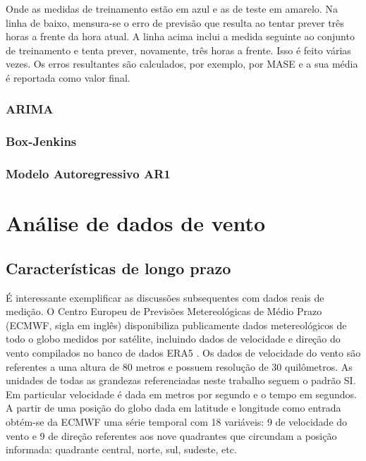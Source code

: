 \documentclass[
	12pt,				%
	openright,			%
	oneside,			%
	a4paper,			%
	english,			%
	french,				%
	spanish,			%
	brazil				%
	]{abntex2}
\begin{document}
Onde as medidas de treinamento estão em azul e as de teste em amarelo. Na linha de baixo, mensura-se o erro de previsão que resulta ao tentar prever três horas a frente da hora atual. A linha acima inclui a medida seguinte ao conjunto de treinamento e tenta prever, novamente, três horas a frente. Isso é feito várias vezes. Os erros resultantes são calculados, por exemplo, por MASE e a sua média é reportada como valor final.

\section{ARIMA}



\section{Box-Jenkins}

\section{Modelo Autoregressivo AR1}

%

\cleardoublepage
\part{Análise de dados de vento}

\chapter{Características de longo prazo}

É interessante exemplificar as discussões subsequentes com dados reais de medição. O Centro Europeu de Previsões Metereológicas de Médio Prazo (ECMWF, sigla em inglês) disponibiliza publicamente dados metereológicos de todo o globo medidos por satélite, incluindo dados de velocidade e direção do vento compilados no banco de dados ERA5 \cite{era5}. Os dados de velocidade do vento são referentes a uma altura de 80 metros e possuem resolução de 30 quilômetros. As unidades de todas as grandezas referenciadas neste trabalho seguem o padrão SI. Em particular velocidade é dada em metros por segundo e o tempo em segundos. A partir de uma posição do globo dada em latitude e longitude como entrada obtém-se da ECMWF uma série temporal com 18 variáveis: 9 de velocidade do vento e 9 de direção referentes aos nove quadrantes que circundam a posição informada: quadrante central, norte, sul, sudeste, etc. 
\end{document}
